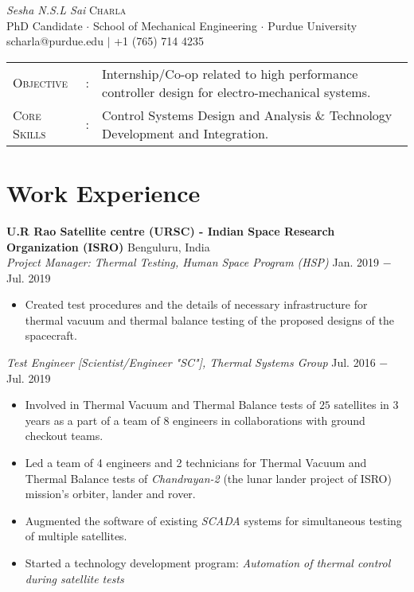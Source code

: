 \documentclass[letterpaper,10pt]{article}
\begin{document}
\begin{center}
\thispagestyle{empty}
\huge{\textit{Sesha N.S.L Sai} \textsc{Charla}}\\
\small PhD Candidate $\cdot$ School of Mechanical Engineering $\cdot$ Purdue University\\
\small scharla@purdue.edu $\mid$ +1 (765) 714 4235   \\
\end{center}



\begin{tabular}{l c l}
    {\large{\textsc{Objective}}}&:& Internship$/$Co-op related to high performance controller design for electro-mechanical systems.\\
	{\large{\textsc{Core Skills}}}&:& Control Systems Design and Analysis \& Technology Development and Integration. %
\end{tabular}


\section{Work Experience}
\noindent \textbf{U.R Rao Satellite centre (URSC) - Indian Space Research Organization (ISRO)} \hfill Benguluru, India \\
\textit{Project Manager: Thermal Testing, Human Space Program (HSP)} \hfill Jan. 2019 $-$ Jul. 2019
\begin{itemize}[noitemsep,nolistsep,leftmargin=0.25in,label={--}]
    \item Created test procedures and the details of necessary infrastructure for thermal vacuum and thermal balance testing of the proposed designs of the spacecraft.
\end{itemize}

\vspace{3pt}
\textit{Test Engineer [Scientist/Engineer "SC"], Thermal Systems Group} \hfill Jul. 2016 $-$ Jul. 2019
\begin{itemize}[noitemsep,nolistsep,leftmargin=0.25in,label={--}]
    \item Involved in Thermal Vacuum and Thermal Balance tests of $25$ satellites in 3 years as a part of a team of 8 engineers in collaborations with ground checkout teams.
	\item Led a team of 4 engineers and 2 technicians for Thermal Vacuum and Thermal Balance tests of \textit{Chandrayan-2} (the lunar lander project of ISRO) mission's orbiter, lander and rover.
    \item Augmented the software of existing \textit{SCADA} systems for simultaneous testing of multiple satellites.
	\item Started a technology development program: \textit{Automation of thermal control during satellite tests}
\end{itemize}
\end{document}
